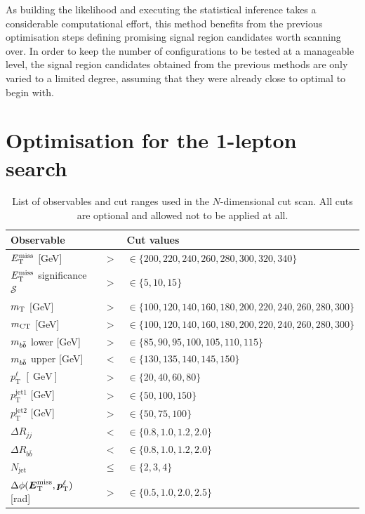 As building the likelihood and executing the statistical inference takes a considerable computational effort, this method benefits from the previous optimisation steps defining promising signal region candidates worth scanning over.
In order to keep the number of configurations to be tested at a manageable level, the signal region candidates obtained from the previous methods are only varied to a limited degree, assuming that they were already close to optimal to begin with.

\section{Optimisation for the 1-lepton search}

\begin{table}
	\centering
	\small
	\setlength\heavyrulewidth{0.2ex}
	\caption{List of observables and cut ranges used in the $N$-dimensional cut scan. All cuts are optional and allowed not to be applied at all.}
	\begin{tabular} {l c l}
		\toprule
		Observable &  & Cut values \\ 
		\midrule
		$E_{\textrm{T}}^{\textrm{miss}}$ [GeV]& $>$ & $\in \{200,220,240,260,280,300,320,340\}$ \\
		$E_{\textrm{T}}^{\textrm{miss}}$ significance $\mathcal{S}$ & $>$ & $\in \{5,10,15\}$ \\
		$m_{\textrm{T}}$ [GeV]& $>$ & $\in \{100, 120, 140,160,180,200,220,240,260,280, 300\}$ \\
		$m_{\textrm{CT}}$ [GeV]& $>$ & $\in \{100, 120, 140,160,180,200,220,240,260,280, 300\}$ \\
		$m_{b\bar{b}}$ lower [GeV]& $>$ & $\in \{85,90,95,100,105,110,115\}$ \\
		$m_{b\bar{b}}$ upper [GeV]& $<$ & $\in \{130,135,140,145,150\}$ \\
		$p_\textrm{T}^\ell$ $[\SI{}{\GeV}]$& $>$ & $\in \{20, 40, 60, 80\}$ \\
		$p_\textrm{T}^\mathrm{jet1}$ [GeV]& $>$ & $\in \{50, 100, 150\}$ \\
		$p_\textrm{T}^\mathrm{jet2}$ [GeV]& $>$ & $\in \{50, 75, 100\}$ \\	
		$\Delta R_{jj}$ & $<$ & $\in \{0.8,1.0,1.2,2.0\}$ \\
		$\Delta R_{b\bar{b}}$ & $<$ & $\in \{0.8,1.0,1.2,2.0\}$ \\
		$N_\mathrm{jet}$ & $\leq$ & $\in \{2,3,4\}$ \\			
		$\Delta\phi (\vetmiss,\vptlep )$ [rad]& $>$ & $\in \{0.5,1.0,2.0,2.5\}$ \\
		\bottomrule					
	\end{tabular}
	\label{tab:cut_scan}   
\end{table}

